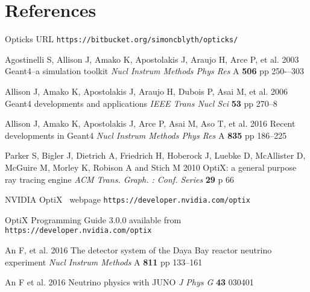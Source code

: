 \documentclass[a4paper]{jpconf}
\begin{document}





\section*{References}
\begin{thebibliography}{9}



Opticks URL {\tt https://bitbucket.org/simoncblyth/opticks/}






Agostinelli S, Allison J, Amako K, Apostolakis J, Araujo H, Arce P, et al. 
2003  
Geant4--a simulation toolkit 
{\it Nucl Instrum Methods Phys Res} A {\bf 506} pp 250-–303 

Allison J, Amako K, Apostolakis J, Araujo H, Dubois P, Asai M, et al. 
2006 
Geant4 developments and applications 
{\it IEEE Trans Nucl Sci} {\bf 53} pp 270--8

Allison J, Amako K, Apostolakis J, Arce P, Asai M, Aso T, et al. 
2016 
Recent developments in Geant4 
{\it Nucl Instrum Methods Phys Res} A {\bf 835} pp 186--225





Parker S, Bigler J, Dietrich A, Friedrich H, Hoberock J, Luebke D, McAllister D, McGuire M, Morley K, Robison A and Stich M 
2010 
OptiX: a general purpose ray tracing engine
{\it ACM Trans. Graph. : Conf. Series} {\bf 29} p 66 

NVIDIA{\textregistered} OptiX\texttrademark~ webpage {\tt https://developer.nvidia.com/optix}

OptiX Programming Guide 3.0.0 available from {\tt https://developer.nvidia.com/optix}






An F, et al.
2016
The detector system of the Daya Bay reactor neutrino experiment
{\it Nucl Instrum Methods} A {\bf 811} pp 133--161

An F et al.  
2016
Neutrino physics with JUNO
{\it J Phys G} {\bf 43} 030401





\end{thebibliography}
\end{document}
